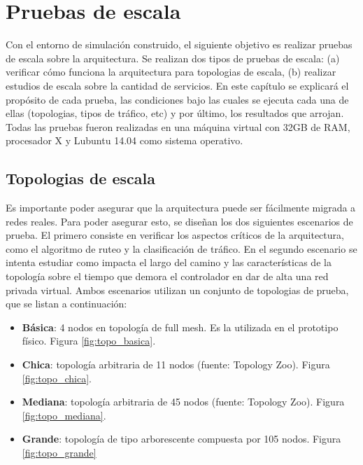 \chapter{Pruebas de escala}

\graphicspath{{Chapter4/Figs/}}

Con el entorno de simulación construido, el siguiente objetivo es realizar pruebas de escala sobre la arquitectura. Se realizan dos tipos de pruebas de escala: (a) verificar cómo funciona la arquitectura para topologias de escala, (b) realizar estudios de escala sobre la cantidad de servicios. En este capítulo se explicará el propósito de cada prueba, las condiciones bajo las cuales se ejecuta cada una de ellas (topologias, tipos de tráfico, etc) y por último, los resultados que arrojan. Todas las pruebas fueron realizadas en una máquina virtual con 32GB de RAM, procesador X y Lubuntu 14.04 como sistema operativo.

\section{Topologias de escala}
Es importante poder asegurar que la arquitectura puede ser fácilmente migrada a redes reales. Para poder asegurar esto, se diseñan los dos siguientes escenarios de prueba. El primero consiste en verificar los aspectos críticos de la arquitectura, como el algoritmo de ruteo y la clasificación de tráfico. En el segundo escenario se intenta estudiar como impacta el largo del camino y las características de la topología sobre el tiempo que demora el controlador en dar de alta una red privada virtual. Ambos escenarios utilizan un conjunto de topologias de prueba, que se listan a continuación:
\begin{itemize}
	\item \textbf{Básica}: 4 nodos en topología de full mesh. Es la utilizada en el prototipo físico. Figura \ref{fig:topo_basica}.
	\item \textbf{Chica}: topología arbitraria de 11 nodos (fuente: Topology Zoo). Figura \ref{fig:topo_chica}.
	\item \textbf{Mediana}: topología arbitraria de 45 nodos (fuente: Topology Zoo). Figura \ref{fig:topo_mediana}.
	\item \textbf{Grande}: topología de tipo arborescente compuesta por 105 nodos. Figura \ref{fig:topo_grande}
\end{itemize}

